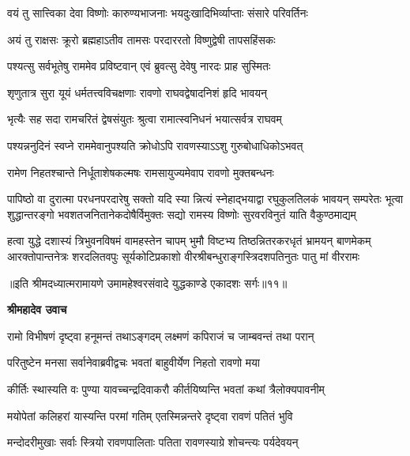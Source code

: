\twolineshloka
{वयं तु सात्त्विका देवा विष्णोः कारुण्यभाजनाः}
{भयदुःखादिभिर्व्याप्ताः संसारे परिवर्तिनः} %

\twolineshloka
{अयं तु राक्षसः क्रूरो ब्रह्महाऽतीव तामसः}
{परदाररतो विष्णुद्वेषी तापसहिंसकः} %

\twolineshloka
{पश्यत्सु सर्वभूतेषु राममेव प्रविष्टवान्}
{एवं ब्रुवत्सु देवेषु नारदः प्राह सुस्मितः} %

\twolineshloka
{शृणुतात्र सुरा यूयं धर्मतत्त्वविचक्षणाः}
{रावणो राघवद्वेषादनिशं हृदि भावयन्} %

\twolineshloka
{भृत्यैः सह सदा रामचरितं द्वेषसंयुतः}
{श्रुत्वा रामात्स्वनिधनं भयात्सर्वत्र राघवम्} %

\twolineshloka
{पश्यन्ननुदिनं स्वप्ने राममेवानुपश्यति}
{क्रोधोऽपि रावणस्याऽऽशु गुरुबोधाधिकोऽभवत्} %

\twolineshloka
{रामेण निहतश्चान्ते निर्धूताशेषकल्मषः}
{रामसायुज्यमेवाप रावणो मुक्तबन्धनः} %

\fourlineindentedshloka
{पापिष्ठो वा दुरात्मा परधनपरदारेषु सक्तो यदि स्या\-}
{न्नित्यं स्नेहाद्भयाद्वा रघुकुलतिलकं भावयन् सम्परेतः}
{भूत्वा शुद्धान्तरङ्गो भवशतजनितानेकदोषैर्विमुक्तः}
{सद्यो रामस्य विष्णोः सुरवरविनुतं याति वैकुण्ठमाद्यम्} %

\fourlineindentedshloka
{हत्वा युद्धे दशास्यं त्रिभुवनविषमं वामहस्तेन चापम्}
{भुमौ विष्टभ्य तिष्ठन्नितरकरधृतं भ्रामयन् बाणमेकम्}
{आरक्तोपान्तनेत्रः शरदलितवपुः सूर्यकोटिप्रकाशो}
{वीरश्रीबन्धुराङ्गस्त्रिदशपतिनुतः पातु मां वीररामः} %

{॥इति श्रीमदध्यात्मरामायणे उमामहेश्वरसंवादे युद्धकाण्डे
एकादशः सर्गः॥११॥
}




\textbf{श्रीमहादेव उवाच}

\twolineshloka
{रामो विभीषणं दृष्ट्वा हनूमन्तं तथाऽङ्गदम्}
{लक्ष्मणं कपिराजं च जाम्बवन्तं तथा परान्} %

\twolineshloka
{परितुष्टेन मनसा सर्वानेवाब्रवीद्वचः}
{भवतां बाहुवीर्येण निहतो रावणो मया} %

\twolineshloka
{कीर्तिः स्थास्यति वः पुण्या यावच्चन्द्रदिवाकरौ}
{कीर्तयिष्यन्ति भवतां कथां त्रैलोक्यपावनीम्} %

\twolineshloka
{मयोपेतां कलिहरां यास्यन्ति परमां गतिम्}
{एतस्मिन्नन्तरे दृष्ट्वा रावणं पतितं भुवि} %

\twolineshloka
{मन्दोदरीमुखाः सर्वाः स्त्रियो रावणपालिताः}
{पतिता रावणस्याग्रे शोचन्त्यः पर्यदेवयन्} %

